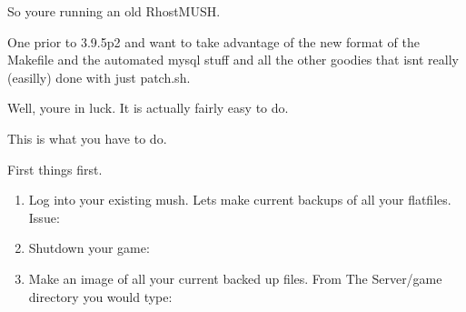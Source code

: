 \documentclass[letterpaper,10pt,english]{sphinxmanual}
\begin{document}
\sphinxAtStartPar
So you\textquotesingle{}re running an old RhostMUSH.

\sphinxAtStartPar
One prior to 3.9.5p2 and want to take advantage of the new
format of the Makefile and the automated mysql stuff and
all the other goodies that isn\textquotesingle{}t really (easilly) done
with just patch.sh.

\sphinxAtStartPar
Well, you\textquotesingle{}re in luck.  It is actually fairly easy to do.

\sphinxAtStartPar
This is what you have to do.

\sphinxAtStartPar
First thing\textquotesingle{}s first.
\begin{enumerate}
%
\item {} 
\sphinxAtStartPar
Log into your existing mush.  Let\textquotesingle{}s make current backups
of all your flatfiles.  Issue:

\begin{sphinxVerbatim}[commandchars=\\\{\}]
\end{sphinxVerbatim}

\item {} 
\sphinxAtStartPar
Shutdown your game:

\begin{sphinxVerbatim}[commandchars=\\\{\}]
\end{sphinxVerbatim}

\item {} 
\sphinxAtStartPar
Make an image of all your current backed up files.  From The Server/game directory you would type:

\begin{sphinxVerbatim}[commandchars=\\\{\}]
 
\end{sphinxVerbatim}

\end{enumerate}
\end{document}
